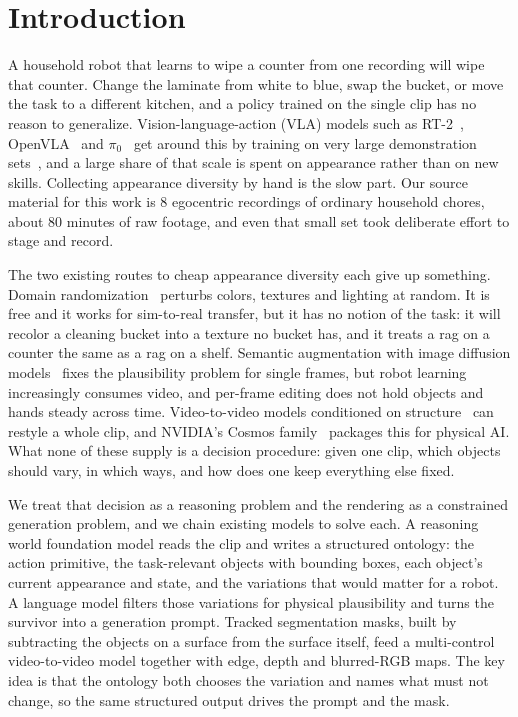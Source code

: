 \section{Introduction}

A household robot that learns to wipe a counter from one recording will wipe that counter. Change the laminate from white to blue, swap the bucket, or move the task to a different kitchen, and a policy trained on the single clip has no reason to generalize. Vision-language-action (VLA) models such as RT-2~\cite{rt2}, OpenVLA~\cite{openvla} and $\pi_0$~\cite{pi0} get around this by training on very large demonstration sets~\cite{oxe}, and a large share of that scale is spent on appearance rather than on new skills. Collecting appearance diversity by hand is the slow part. Our source material for this work is 8 egocentric recordings of ordinary household chores, about 80 minutes of raw footage, and even that small set took deliberate effort to stage and record.

The two existing routes to cheap appearance diversity each give up something. Domain randomization~\cite{tobin2017,peng2018} perturbs colors, textures and lighting at random. It is free and it works for sim-to-real transfer, but it has no notion of the task: it will recolor a cleaning bucket into a texture no bucket has, and it treats a rag on a counter the same as a rag on a shelf. Semantic augmentation with image diffusion models~\cite{rosie,genaug} fixes the plausibility problem for single frames, but robot learning increasingly consumes video, and per-frame editing does not hold objects and hands steady across time. Video-to-video models conditioned on structure~\cite{gen1,controlnet} can restyle a whole clip, and NVIDIA's Cosmos family~\cite{cosmos2025,cosmostransfer1} packages this for physical AI. What none of these supply is a decision procedure: given one clip, which objects should vary, in which ways, and how does one keep everything else fixed.

We treat that decision as a reasoning problem and the rendering as a constrained generation problem, and we chain existing models to solve each. A reasoning world foundation model reads the clip and writes a structured ontology: the action primitive, the task-relevant objects with bounding boxes, each object's current appearance and state, and the variations that would matter for a robot. A language model filters those variations for physical plausibility and turns the survivor into a generation prompt. Tracked segmentation masks, built by subtracting the objects on a surface from the surface itself, feed a multi-control video-to-video model together with edge, depth and blurred-RGB maps. The key idea is that the ontology both chooses the variation and names what must not change, so the same structured output drives the prompt and the mask.


